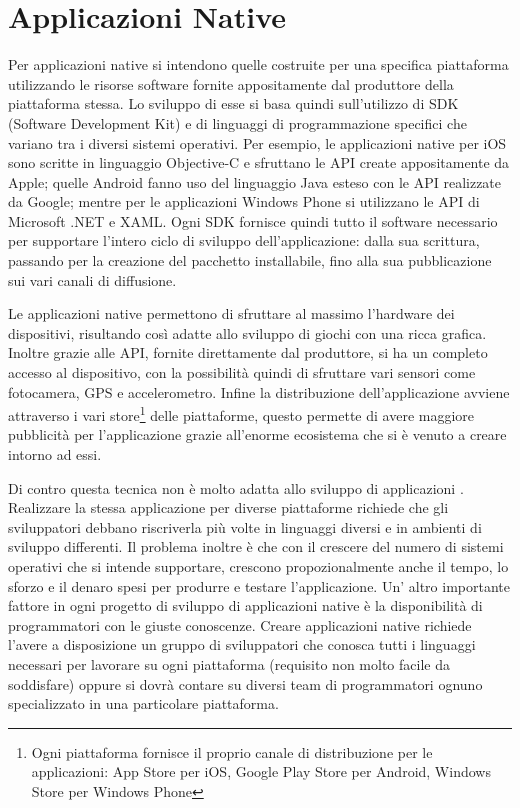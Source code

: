     \section{Applicazioni Native}
    \label{sec:nativapp}
        Per applicazioni native si intendono quelle costruite per una specifica
        piattaforma utilizzando le risorse software fornite appositamente dal
        produttore della piattaforma stessa.
        Lo sviluppo di esse si basa quindi sull'utilizzo di SDK
        (Software Development Kit) e di
        linguaggi di programmazione specifici che variano tra i diversi
        sistemi operativi. Per esempio,
        le applicazioni native per iOS sono scritte in linguaggio Objective-C
        e sfruttano le API create appositamente da Apple; quelle Android fanno
        uso del linguaggio Java esteso con le API realizzate da Google; mentre
        per le applicazioni Windows Phone si utilizzano le API di
        Microsoft .NET e XAML. Ogni SDK fornisce quindi tutto il software necessario
        per supportare l'intero ciclo di sviluppo dell'applicazione: dalla sua
        scrittura, passando per la creazione del pacchetto installabile, fino
        alla sua pubblicazione sui vari canali di diffusione.

        Le applicazioni native permettono di sfruttare al massimo l'hardware
        dei dispositivi, risultando così adatte allo sviluppo di giochi con
        una ricca grafica. Inoltre grazie alle
        API, fornite direttamente dal produttore, si ha un completo accesso al
        dispositivo, con la possibilità quindi di sfruttare vari sensori
        come fotocamera, GPS e accelerometro. Infine la distribuzione
        dell'applicazione avviene attraverso i vari store\footnote{Ogni
        piattaforma
        fornisce il proprio canale di distribuzione per le applicazioni:
        App Store per iOS, Google Play Store per Android, Windows Store per
        Windows Phone} delle piattaforme, questo permette di avere maggiore
        pubblicità per l'applicazione grazie all'enorme ecosistema che si è
        venuto a creare intorno ad essi.

        Di contro questa tecnica non è molto adatta allo sviluppo di
        applicazioni \crossplat{}. Realizzare la stessa applicazione per
        diverse piattaforme richiede che gli sviluppatori debbano riscriverla
        più volte in linguaggi diversi e in ambienti di
        sviluppo differenti. Il problema inoltre è che con il crescere del
        numero di sistemi operativi che si intende supportare, crescono
        propozionalmente anche il tempo, lo
        sforzo e il denaro spesi per produrre e testare l'applicazione.
        Un' altro importante fattore in ogni progetto di sviluppo di
        applicazioni native \crossplat{} è la disponibilità di programmatori
        con le giuste conoscenze. Creare applicazioni native richiede
        l'avere a disposizione un gruppo di sviluppatori che conosca tutti i
        linguaggi necessari per lavorare su ogni piattaforma (requisito
        non molto facile da soddisfare) oppure si dovrà contare su diversi team
        di programmatori ognuno specializzato in una particolare piattaforma.

